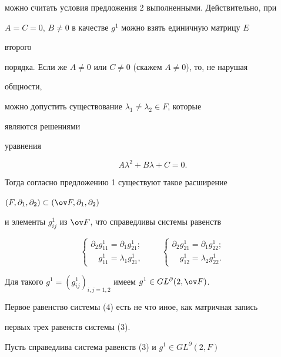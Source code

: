 можно считать условия предложения 2 выполненными. Действительно, при  


$A=C=0$, $B\ne0$ в качестве $g^1$ можно взять единичную матрицу $E$ 


второго  


порядка. Если же $A\ne0$ или $C\ne0$ (скажем $A\ne0$), то, не нарушая 


общности, 


можно допустить существование $\lambda_1\ne\lambda_2\in F$, которые 


являются решениями  


уравнения 


$$ 


A\lambda^2+B\lambda+C=0. 


$$ 


Тогда согласно предложению 1 существуют такое расширение 


$(F,\partial_1,\partial_2)\subset(\ov F,\partial_1,\partial_2)$ 


и элементы $g^1_{ij}$ из $\ov F$, что справедливы системы равенств 


$$ 


\begin{cases} 


\partial_2g^1_{11}=\partial_1g^1_{21};\\ 


\phantom{\partial_2}g^1_{11}=\lambda_1g^1_{21}, 


\end{cases} 


\qquad 


\begin{cases} 


\partial_2g^1_{21}=\partial_1g^1_{22};\\ 


\phantom{\partial_2}g^1_{12}=\lambda_2g^1_{22}. 


\end{cases} 


$$ 


Для такого $g^1=(g^1_{ij})_{i,j=1,2}$ имеем $g^1\in GL^\partial(2,\ov 


F)$. 


 


Первое равенство системы (4) есть не что иное, как матричная запись  


первых трех равенств системы (3). 


Пусть справедлива система равенств (3) и $g^1\in GL^\partial(2,F)$ 


